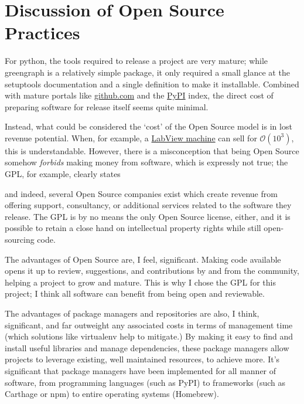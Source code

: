 \documentclass[12pt,a4paper]{article}
\begin{document}
\pagebreak

\section*{Discussion of Open Source Practices}
For python, the tools required to release a project are very mature; while greengraph is a relatively simple package, it only required a small glance at the setuptools documentation and a single definition to make it installable. Combined with mature portals like \url{github.com} and the \href{https://pypi.python.org/pypi}{PyPI} index, the direct cost of preparing software for release itself seems quite minimal. 

Instead, what could be considered the `cost' of the Open Source model is in lost revenue potential. When, for example, a \href{http://actimetrics.com/products/clocklab/}{LabView machine} can sell for \textsterling $\mathcal{O}(10^{3})$, this is understandable. However, there is a misconception that being Open Source somehow \textit{forbids} making money from software, which is expressly not true; the GPL, for example, clearly states

\textit{}

and indeed, several Open Source companies exist which create revenue from offering support, consultancy, or additional services related to the software they release. The GPL is by no means the only Open Source license, either, and it is possible to retain a close hand on intellectual property rights while still open-sourcing code. 

The advantages of Open Source are, I feel, significant. Making code available opens it up to review, suggestions, and contributions by and from the community, helping a project to grow and mature. This is why I chose the GPL for this project; I think all software can benefit from being open and reviewable.

The advantages of package managers and repositories are also, I think, significant, and far outweight any associated costs in terms of management time (which solutions like virtualenv help to mitigate.) By making it easy to find and install useful libraries and manage dependencies, these package managers allow projects to leverage existing, well maintained resources, to achieve more. It's significant that package managers have been implemented for all manner of software, from programming languages (such as PyPI) to frameworks (such as Carthage or npm) to entire operating systems (Homebrew). 
\end{document}

